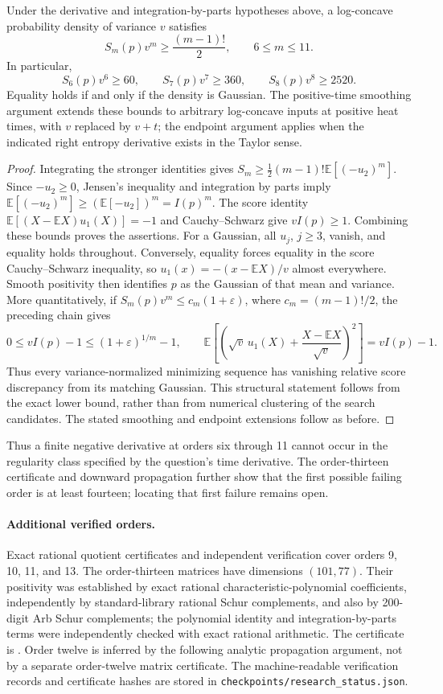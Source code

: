 \begin{proposition}
Under the derivative and integration-by-parts hypotheses above, a log-concave
probability density of variance $v$ satisfies
\[
 S_m(p)v^m\ge\frac{(m-1)!}{2},\qquad 6\le m\le11.
\]
In particular,
\[
 S_6(p)v^6\ge60,\qquad S_7(p)v^7\ge360,\qquad S_8(p)v^8\ge2520.
\]
Equality holds if and only if the density is Gaussian. The positive-time smoothing argument extends
these bounds to arbitrary log-concave inputs at positive heat times, with
$v$ replaced by $v+t$; the endpoint argument applies when the indicated
right entropy derivative exists in the Taylor sense.
\end{proposition}
\begin{proof}
Integrating the stronger identities gives
$S_m\ge\tfrac12(m-1)!\mathbb E[(-u_2)^m]$.
Since $-u_2\ge0$, Jensen's inequality and integration by parts imply
$\mathbb E[(-u_2)^m]\ge(\mathbb E[-u_2])^m=I(p)^m$.
The score identity $\mathbb E[(X-\mathbb EX)u_1(X)]=-1$ and Cauchy--Schwarz
give $vI(p)\ge1$. Combining these bounds proves the assertions.
For a Gaussian, all $u_j$, $j\ge3$, vanish, and equality holds throughout.
Conversely, equality forces equality in the score Cauchy--Schwarz inequality,
so $u_1(x)=-(x-\mathbb EX)/v$ almost everywhere. Smooth positivity then
identifies $p$ as the Gaussian of that mean and variance.
More quantitatively, if $S_m(p)v^m\le c_m(1+\varepsilon)$, where
$c_m=(m-1)!/2$, the preceding chain gives
\[
 0\le vI(p)-1\le(1+\varepsilon)^{1/m}-1,\qquad
 \mathbb E\!\left[\left(\sqrt v\,u_1(X)+
 \frac{X-\mathbb EX}{\sqrt v}\right)^2\right]=vI(p)-1.
\]
Thus every variance-normalized minimizing sequence has vanishing
relative score discrepancy from its matching Gaussian. This structural
statement follows from the exact lower bound, rather than from numerical
clustering of the search candidates.
The stated smoothing and endpoint extensions follow as before.
\end{proof}
Thus a finite negative derivative at orders six through 11 cannot
occur in the regularity class specified by the question's time derivative.
The order-thirteen certificate and downward propagation further show that the first possible failing order is at least fourteen; locating that first
failure remains open.

\paragraph{Additional verified orders.}
Exact rational quotient certificates and independent verification cover orders 9, 10, 11, and 13. The order-thirteen matrices have dimensions $(101,77)$. Their positivity was established by exact rational characteristic-polynomial coefficients, independently by standard-library rational Schur complements, and also by 200-digit Arb Schur complements; the polynomial identity and integration-by-parts terms were independently checked with exact rational arithmetic. The certificate is . Order twelve is inferred by the following analytic propagation argument, not by a separate order-twelve matrix certificate. The machine-readable verification records and certificate hashes are stored in \texttt{checkpoints/research\_status.json}.

